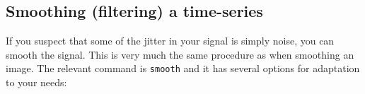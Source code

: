 \subsection{Smoothing (filtering) a time-series}
If you suspect that some of the jitter in your signal is simply noise, you can smooth the signal.
This is very much the same procedure as when smoothing an image.
The relevant command is \lstinline{smooth} and it has several options for adaptation to your needs: